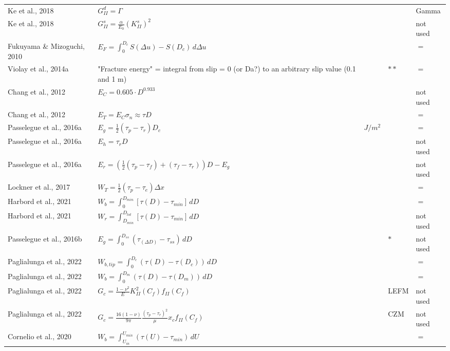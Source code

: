 \documentclass{article}
\begin{document}
\begin{longtable}{|p{4 cm}|p{8 cm}|p{1.25 cm}|p{1.25 cm}|p{1.5 cm}|}
Ke et al., 2018 & \( \displaystyle G_{II}^d = \Gamma \) & & & Gamma \\
Ke et al., 2018 & \( \displaystyle G_{II}^s = \frac{\alpha}{E_0} (K_{II}^s)^2 \) & & & not used \\
Fukuyama \& Mizoguchi, 2010 & \( \displaystyle E_F = \int_{0}^{D_c} S(\Delta u) - S(D_c) \,d \Delta u \) & & & $=$ \\
Violay et al., 2014a & "Fracture energy" = integral from slip = 0 (or Da?) to an arbitrary slip value (0.1 and 1 m) & & $**$ & $=$ \\
Chang et al., 2012 & \( \displaystyle E_C = 0.605 \cdot D^{0.933} \) & & & not used \\
Chang et al., 2012 & \( \displaystyle E_T = E_C \sigma_n \approx \tau D\) & & & $=$ \\
Passelegue et al., 2016a & \( \displaystyle E_g = \frac{1}{2} (\tau_p - \tau_r) D_c \) & $J/m^2$ & & $=$ \\
Passelegue et al., 2016a & \( \displaystyle E_h = \tau_r D \) & & & not used \\
Passelegue et al., 2016a & \( \displaystyle E_r = \left ( \frac{1}{2} (\tau_p - \tau_f) + (\tau_f - \tau_r) \right ) D - E_g  \) & & & not used \\
Lockner et al., 2017 & \( \displaystyle W_T = \frac{1}{2} (\tau_p - \tau_e) \Delta x \) & & & $=$ \\
Harbord et al., 2021 & \( \displaystyle W_b = \int_{0}^{D_{min}} [\tau(D) - \tau_{min}] \,d D \) & & & $=$ \\
Harbord et al., 2021 & \( \displaystyle W_r = \int_{D_{min}}^{D_{tot}} [\tau(D) - \tau_{min}] \,d D \) & & & not used \\
Passelegue et al., 2016b & \( \displaystyle E_g = \int_{0}^{D_{ss}} (\tau_{(\Delta D)} - \tau_{ss}) \,d D \) & & $*$ & not used \\
Paglialunga et al., 2022 & \( \displaystyle W_{b,tip} = \int_{0}^{D_c} (\tau(D)-\tau(D_c)) \,d D \) & & & $=$ \\
Paglialunga et al., 2022 & \( \displaystyle W_b = \int_{0}^{D_m} (\tau(D)-\tau(D_m)) \,d D \) & & & $=$ \\
Paglialunga et al., 2022 & \( \displaystyle G_c = \frac{1-\nu^2}{E} K_{II}^2 (C_f) f_{II} (C_f)\) & & LEFM & not used \\
Paglialunga et al., 2022 & \( \displaystyle G_c = \frac{16(1-\nu)}{9\pi} \frac{(\tau_p-\tau_r)^2}{\mu} x_c f_{II} (C_f) \) & & CZM & not used \\
Cornelio et al., 2020 & \( \displaystyle W_b = \int_{U_{in}}^{U_{min}} (\tau(U) - \tau_{min}) \,d U \) & & & $=$ \\

\end{longtable}
\end{document}
